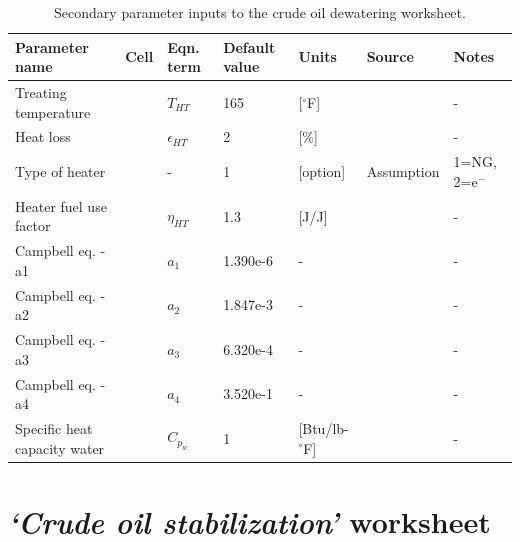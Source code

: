 \documentclass[11pt]{report}
\newcommand{\cellref}[1]{\raisebox{1pt}{\fcolorbox{stanford}{light-gray}{\texttt{\textcolor{stanford}{\scriptsize{#1}}}}}}
\newcommand{\sheet}[1]{\textit{`{#1}'}}
\begin{document}
\begin{table}
\caption{Secondary parameter inputs to the crude oil dewatering worksheet.}
\label{tab:Heater-treater_SI}
\begin{scriptsize}
\begin{tabularx}{1\columnwidth}{p{}p{}p{}p{}p{}p{}p{}}
\toprule
Parameter name			& Cell	& Eqn. term		& Default value   		& Units 	& Source			      			& Notes 		\\ 
\midrule
Treating temperature			& \cellref{M42}	& $T_{HT}$		& 165				& [$^\circ$F]	& \cite{Manning1991}		& -			\\
Heat loss					& \cellref{M43}	& $\epsilon_{HT}$	& 2					& [\%] 		& \cite{Manning1991}		& -			\\
Type of heater				& \cellref{M44}	& -				& 1					& [option]		& Assumption				& 1=NG, 2=e$^-$			\\
Heater fuel use	factor		& \cellref{M45}	& $\eta_{HT}$		& 1.3					& [J/J]		& \cite{EPA2008}			& -			\\
Campbell eq. - a1			& \cellref{M47}	&$a_1$			& 1.390e-6			& -			& \cite{Manning1991}		& -			\\
Campbell eq. - a2			& \cellref{M48}	&$a_2$			& 1.847e-3			& - 			& \cite{Manning1991}		& -			\\
Campbell eq. - a3			& \cellref{M49}	&$a_3$			& 6.320e-4			& -			& \cite{Manning1991}		& -			\\
Campbell eq. - a4			& \cellref{M50}	&$a_4$			& 3.520e-1			& -			& \cite{Manning1991}		& -			\\
Specific heat capacity water	& \cellref{M51}	& $C_{p_w}$		& 1					& [Btu/lb-$^\circ$F] & \cite{Manning1991}		& -			\\
\bottomrule
\end{tabularx}
\end{scriptsize}
\end{table}





\clearpage





\section{\sheet{Crude oil stabilization} worksheet}
\label{sec:crude_stabilization}
\end{document}
